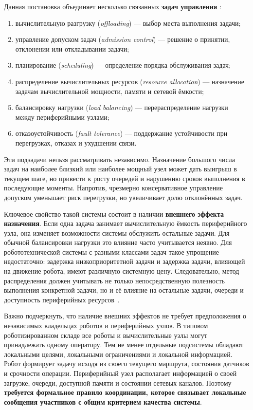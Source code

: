 Данная постановка объединяет несколько связанных \textbf{задач управления}
\cite{Luo2021ResourceScheduling,Li2024ResourceConstrainedMEC,Qin2024DecentralizedTask}:
\begin{enumerate}
	\item вычислительную разгрузку (\textit{offloading}) --- выбор места выполнения задачи;
	\item управление допуском задач (\textit{admission control}) ---  решение о принятии, отклонении или откладывании задачи;
	\item планирование (\textit{scheduling}) --- определение порядка обслуживания задач;
	\item распределение вычислительных ресурсов (\textit{resource allocation}) --- назначение задачам вычислительной мощности, памяти и сетевой ёмкости;
	\item балансировку нагрузки (\textit{load balancing}) --- перераспределение нагрузки между периферийными узлами;
	\item отказоустойчивость (\textit{fault tolerance}) --- поддержание устойчивости при перегрузках, отказах и ухудшении связи.
\end{enumerate}
Эти подзадачи нельзя рассматривать независимо. Назначение большого числа задач на наиболее близкий или наиболее мощный узел может дать выигрыш в текущем шаге, но привести к росту очередей и нарушению сроков выполнения в последующие моменты. Напротив, чрезмерно консервативное управление допуском уменьшает риск перегрузки, но увеличивает долю отклонённых задач.

Ключевое свойство такой системы состоит в наличии \textbf{внешнего эффекта назначения}. Если одна задача занимает вычислительную ёмкость периферийного узла, она изменяет возможности системы обслужить остальные задачи. Для обычной балансировки нагрузки это влияние часто учитывается неявно. Для робототехнической системы с разными классами задач такое упрощение недостаточно: задержка низкоприоритетной задачи и задержка задачи, влияющей на движение робота, имеют различную системную цену. Следовательно, метод распределения должен учитывать не только непосредственную полезность выполнения конкретной задачи, но и её влияние на остальные задачи, очереди и доступность периферийных ресурсов~\cite{Tereschenko2024SPDOnlineFilter, Korkhov2023MPIBottlenecks,Gankevich2021CheckpointsParallelComputing,Tereschenko2021PythonDistributedComputing1,Tereschenko2021PythonDistributedComputing2}.

Важно подчеркнуть, что наличие внешних эффектов не требует предположения о независимых владельцах роботов и периферийных узлов. В типовом роботизированном складе все роботы и вычислительные узлы могут принадлежать одному оператору. Тем не менее отдельные подсистемы обладают локальными целями, локальными ограничениями и локальной информацией. Робот формирует задачу исходя из своего текущего маршрута, состояния датчиков и срочности операции. Периферийный узел располагает информацией о своей загрузке, очереди, доступной памяти и состоянии сетевых каналов. Поэтому \textbf{требуется формальное правило координации, которое связывает локальные сообщения участников с общим критерием качества системы}.

